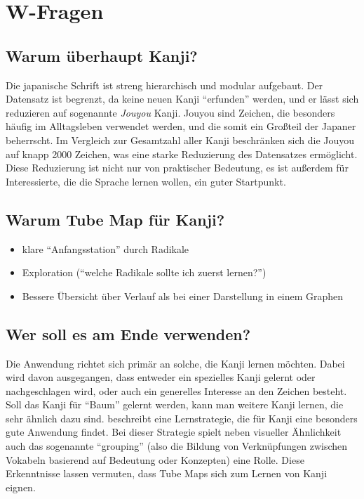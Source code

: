\section{W-Fragen}
\subsection{Warum überhaupt Kanji?}
Die japanische Schrift ist streng hierarchisch und modular aufgebaut. Der Datensatz ist begrenzt, da keine neuen Kanji "`erfunden"' werden, und er lässt sich reduzieren auf sogenannte \emph{Jouyou} Kanji. Jouyou sind Zeichen, die besonders häufig im Alltagsleben verwendet werden, und die somit ein Großteil der Japaner beherrscht. Im Vergleich zur Gesamtzahl aller Kanji beschränken sich die Jouyou auf knapp 2000 Zeichen, was eine starke Reduzierung des Datensatzes ermöglicht.
Diese Reduzierung ist nicht nur von praktischer Bedeutung, es ist außerdem für Interessierte, die die Sprache lernen wollen, ein guter Startpunkt. 

\subsection{Warum Tube Map für Kanji?}
\begin{itemize}
\item klare "`Anfangsstation"' durch Radikale
\item Exploration ("`welche Radikale sollte ich zuerst lernen?"')
\item Bessere Übersicht über Verlauf als bei einer Darstellung in einem Graphen
\end{itemize}

\subsection{Wer soll es am Ende verwenden?}
Die Anwendung richtet sich primär an solche, die Kanji lernen möchten. Dabei wird davon ausgegangen, dass entweder ein spezielles Kanji gelernt oder nachgeschlagen wird, oder auch ein generelles Interesse an den Zeichen besteht. Soll das Kanji für "`Baum"' gelernt werden, kann man weitere Kanji lernen, die sehr ähnlich dazu sind. 
\cite{kanjilearningjapanese10} beschreibt eine Lernstrategie, die für Kanji eine besonders gute Anwendung findet. Bei dieser Strategie spielt neben visueller Ähnlichkeit auch das sogenannte "`grouping"' (also die Bildung von Verknüpfungen zwischen Vokabeln basierend auf Bedeutung oder Konzepten) eine Rolle. 
Diese Erkenntnisse lassen vermuten, dass Tube Maps sich zum Lernen von Kanji eignen.
